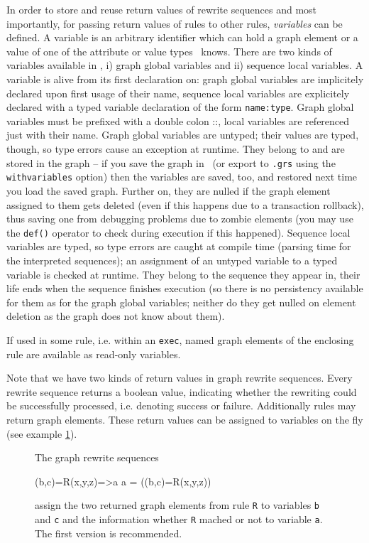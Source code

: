 In order to store and reuse return values of rewrite sequences and most importantly, 
for passing return values of rules to other rules, \emph{variables} can be defined.
A variable is an arbitrary identifier which can hold a graph element or a value of one of the attribute or value types \GrG\ knows.
There are two kinds of variables available in \GrG,
i) graph global variables and 
ii) sequence local variables.
A variable is alive from its first declaration on: graph global variables are implicitely declared upon first usage of their name,
sequence local variables are explicitely declared with a typed variable declaration of the form \texttt{name:type}.
Graph global variables must be prefixed with a double colon ::, local variables are referenced just with their name.
Graph global variables are untyped; their values are typed, though, so type errors cause an exception at runtime.
They belong to and are stored in the graph -- if you save the graph in \GrShell\ (or export to \texttt{.grs} using the \texttt{withvariables} option)
then the variables are saved, too, and restored next time you load the saved graph.
Further on, they are nulled if the graph element assigned to them gets deleted (even if this happens due to a transaction rollback),
thus saving one from debugging problems due to zombie elements (you may use the \texttt{def()} operator to check during execution if this happened).
Sequence local variables are typed, so type errors are caught at compile time (parsing time for the interpreted sequences); 
an assignment of an untyped variable to a typed variable is checked at runtime.
They belong to the sequence they appear in, their life ends when the sequence finishes execution 
(so there is no persistency available for them as for the graph global variables; neither do they get nulled on element deletion as the graph does not know about them). 

If used in some rule, i.e. within an \texttt{exec}, named graph elements of the enclosing rule are available as read-only variables.

Note that we have two kinds of return values in graph rewrite sequences.
Every rewrite sequence returns a boolean value, indicating whether the rewriting could be successfully processed, i.e. denoting success or failure.
Additionally rules may return graph elements.
These return values can be assigned to variables on the fly (see example \ref{ex:grsreturn}).
\begin{figure}[htbp]
\begin{example}
	\label{ex:grsreturn}
The graph rewrite sequences
	\begin{grgen}	 
(b,c)=R(x,y,z)=>a
a = ((b,c)=R(x,y,z))
	\end{grgen}
assign the two returned graph elements from rule \texttt{R} to variables \texttt{b} and \texttt{c} and the information whether \texttt{R} mached or not to variable \texttt{a}. The first version is recommended.
\end{example}
\end{figure}


